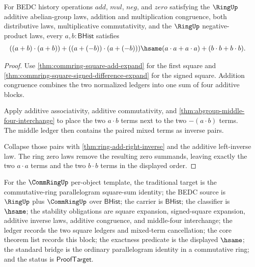 \begin{theorem}
\label{thm:commring-parallelogram-square-sum}
For BEDC history operations $add$, $mul$, $neg$, and $zero$ satisfying the
$\RingUp$ additive abelian-group laws, addition and multiplication congruence,
both distributive laws, multiplicative commutativity, and the $\RingUp$
negative-product laws, every $a,b : \mathsf{BHist}$ satisfies
$$
((a+b)\cdot(a+b))+((a+(-b))\cdot(a+(-b)))\hsame
(a\cdot a+a\cdot a)+(b\cdot b+b\cdot b).
$$
\end{theorem}
\begin{proof}
Use \autoref{thm:commring-square-add-expand} for the first square and
\autoref{thm:commring-square-signed-difference-expand} for the signed square.
Addition congruence combines the two normalized ledgers into one sum of
four additive blocks.

Apply additive associativity, additive commutativity, and
\autoref{thm:abgroup-middle-four-interchange} to place the two $a\cdot b$
terms next to the two $-(a\cdot b)$ terms. The middle ledger then contains
the paired mixed terms as inverse pairs.

Collapse those pairs with \autoref{thm:ring-add-right-inverse} and the
additive left-inverse law. The ring zero laws remove the resulting zero
summands, leaving exactly the two $a\cdot a$ terms and the two $b\cdot b$
terms in the displayed order.
\end{proof}

For the $\CommRingUp$ per-object template, the traditional target is the
commutative-ring parallelogram square-sum identity; the BEDC source is
$\RingUp$ plus $\CommRingUp$ over $\mathsf{BHist}$; the carrier is
$\mathsf{BHist}$; the classifier is $\hsame$; the stability obligations are
square expansion, signed-square expansion, additive inverse laws, additive
congruence, and middle-four interchange; the ledger records the two square
ledgers and mixed-term cancellation; the core theorem list records this block;
the exactness predicate is the displayed $\hsame$; the standard bridge is the
ordinary parallelogram identity in a commutative ring; and the status is
$\mathsf{ProofTarget}$.

